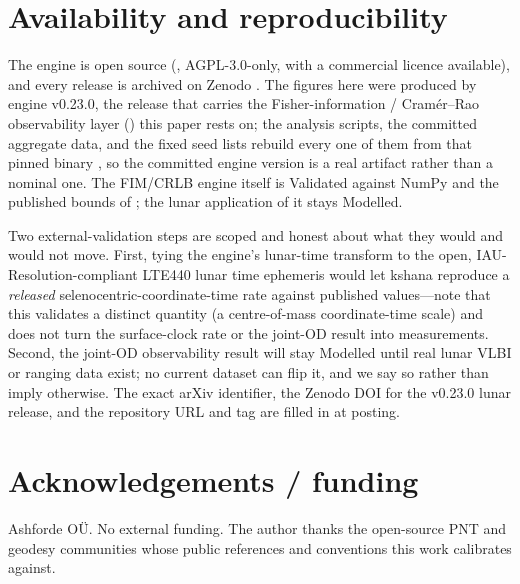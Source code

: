 \section{Availability and reproducibility}

The engine is open source (, AGPL-3.0-only, with a commercial
licence available), and every release is archived on Zenodo
\citep{baweja2026kshana}. The figures here were produced by engine v0.23.0, the
release that carries the Fisher-information / Cram\'er--Rao observability layer
() this paper rests on; the analysis scripts, the committed aggregate
data, and the fixed seed lists rebuild every one of them from that pinned binary
\citep{fernandezprades2018reproducibility}, so the committed engine version is a
real artifact rather than a nominal one. The FIM/CRLB engine itself is Validated
against NumPy and the published bounds of \citet{kay1993}; the lunar application
of it stays Modelled.

Two external-validation steps are scoped and honest about what they would and
would not move. First, tying the engine's lunar-time transform to the open,
IAU-Resolution-compliant LTE440 lunar time ephemeris would let kshana reproduce a
\emph{released} selenocentric-coordinate-time rate against published values---note
that this validates a distinct quantity (a centre-of-mass coordinate-time scale)
and does not turn the surface-clock rate or the joint-OD result into measurements.
Second, the joint-OD observability result will stay Modelled until real lunar VLBI
or ranging data exist; no current dataset can flip it, and we say so rather than
imply otherwise. The exact arXiv identifier, the Zenodo DOI for the v0.23.0 lunar
release, and the repository URL and tag are filled in at posting.

\section*{Acknowledgements / funding}

Ashforde O\"U. No external funding. The author thanks the open-source PNT and
geodesy communities whose public references and conventions this work calibrates
against.
